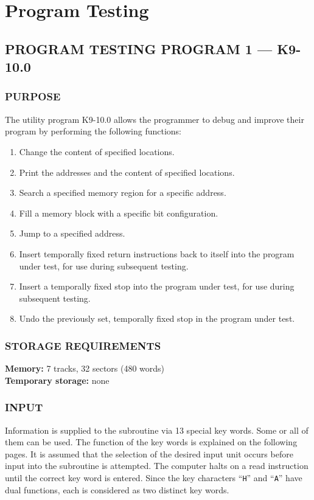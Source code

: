 \section{Program Testing}
\subsection*{PROGRAM TESTING PROGRAM 1 --- K9-10.0}

\subsubsection*{PURPOSE}
The utility program K9-10.0 allows the programmer to debug and improve their program by performing the following functions:
\begin{enumerate}
    \item Change the content of specified locations.
    \item Print the addresses and the content of specified locations.
    \item Search a specified memory region for a specific address.
    \item Fill a memory block with a specific bit configuration.
    \item Jump to a specified address.
    \item Insert temporally fixed return instructions back to itself into the program under test, for use during subsequent testing.
    \item Insert a temporally fixed stop into the program under test, for use during subsequent testing.
    \item Undo the previously set, temporally fixed stop in the program under test.
\end{enumerate}

\subsubsection*{STORAGE REQUIREMENTS}
\textbf{Memory:} 7 tracks, 32 sectors (480 words) \\
\textbf{Temporary storage:} none

\subsubsection*{INPUT}
Information is supplied to the subroutine via 13 special key words. Some or all of them can be used. The function of the key words is explained on the following pages. It is assumed that the selection of the desired input unit occurs before input into the subroutine is attempted. The computer halts on a read instruction until the correct key word is entered. Since the key characters ``\texttt{H}'' and ``\texttt{A}'' have dual functions, each is considered as two distinct key words.

